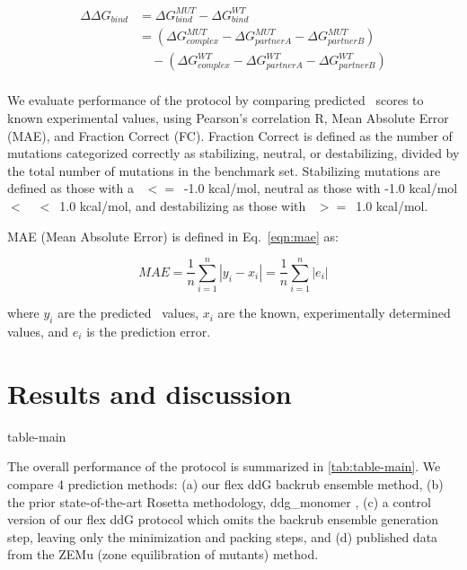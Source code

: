 \begin{equation}\label{eqn:split-ddg}
  \begin{split}
    {\Delta\Delta}G_{bind} & ={\Delta}G^{MUT}_{bind} - {\Delta}G^{WT}_{bind}\\
    & =({\Delta}G^{MUT}_{complex} - {\Delta}G^{MUT}_{partner A} - {\Delta}G^{MUT}_{partner B})\\
    & \quad - ({\Delta}G^{WT}_{complex} - {\Delta}G^{WT}_{partner A} - {\Delta}G^{WT}_{partner B})\\
  \end{split}
\end{equation}

We evaluate performance of the protocol by comparing predicted \ddg\ scores to known experimental values, using Pearson's correlation R, Mean Absolute Error (MAE), and Fraction Correct (FC). Fraction Correct is defined as the number of mutations categorized correctly as stabilizing, neutral, or destabilizing, divided by the total number of mutations in the benchmark set. Stabilizing mutations are defined as those with a \ddg\ $<=$\ -1.0 kcal/mol, neutral as those with -1.0 kcal/mol $<$\ \ddg\ $<$\ 1.0 kcal/mol, and destabilizing as those with \ddg\ $>=$\ 1.0 kcal/mol.

MAE (Mean Absolute Error) is defined in Eq.~\ref{eqn:mae} as:

\begin{equation}\label{eqn:mae}
  MAE = \dfrac{1}{n}\sum\limits_{i=1}^n|y_i-x_i| = \dfrac{1}{n}\sum\limits_{i=1}^n|e_i|
\end{equation}

where $y_i$ are the predicted \ddg\ values, $x_i$ are the known, experimentally determined values, and $e_i$ is the prediction error.

\section{Results and discussion}

{table-main}

The overall performance of the protocol is summarized in \cref{tab:table-main}.
We compare 4 prediction methods: (a) our flex ddG backrub ensemble method, (b) the prior state-of-the-art Rosetta methodology, ddg\_monomer \cite{kellogg_role_2011}, (c) a control version of our flex ddG protocol which omits the backrub ensemble generation step, leaving only the minimization and packing steps, and (d) published data from the ZEMu (zone equilibration of mutants) method\cite{dourado_multiscale_2014}.

